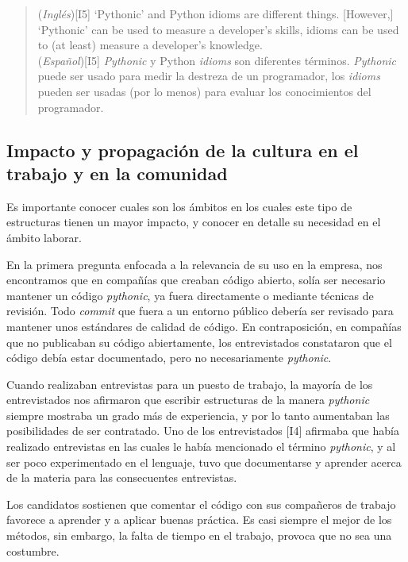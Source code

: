 \documentclass[a4paper, 12pt]{book}
\begin{document}
\begin{quote}
\small
    (\textit{Inglés})[I5] ‘Pythonic’ and Python idioms are different things. [However,] ‘Pythonic’ can be used to measure a developer’s skills, idioms can be used to (at least) measure a developer’s knowledge. \\
    (\textit{Español})[I5] \textit{Pythonic} y Python \textit{idioms} son diferentes términos. \textit{Pythonic} puede ser usado para medir la destreza de un programador, los \textit{idioms} pueden ser usadas (por lo menos) para evaluar los conocimientos del programador. 
\end{quote}

\subsection{Impacto y propagación de la cultura en el trabajo y en la comunidad}

Es importante conocer cuales son los ámbitos en los cuales este tipo de estructuras tienen un mayor impacto, y conocer en detalle su necesidad en el ámbito laborar.

En la primera pregunta enfocada a la relevancia de su uso en la empresa, nos encontramos que en compañías que creaban código abierto, solía ser necesario mantener un código \textit{pythonic}, ya fuera directamente o mediante técnicas de revisión. Todo \textit{commit} que fuera a un entorno público debería ser revisado para mantener unos estándares de calidad de código. En contraposición, en compañías que no publicaban su código abiertamente, los entrevistados constataron que el código debía estar documentado, pero no necesariamente \textit{pythonic}.

Cuando realizaban entrevistas para un puesto de trabajo, la mayoría de los entrevistados nos afirmaron que escribir estructuras de la manera \textit{pythonic} siempre mostraba un grado más de experiencia, y por lo tanto aumentaban las posibilidades de ser contratado. Uno de los entrevistados [I4] afirmaba que había realizado entrevistas en las cuales le había mencionado el término \textit{pythonic}, y al ser poco experimentado en el lenguaje, tuvo que documentarse y aprender acerca de la materia para las consecuentes entrevistas.

Los candidatos sostienen que comentar el código con sus compañeros de trabajo favorece a aprender y a aplicar buenas práctica. Es casi siempre el mejor de los métodos, sin embargo, la falta de tiempo en el trabajo, provoca que no sea una costumbre.
\end{document}
